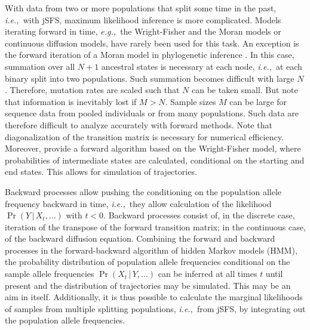 \documentclass[preprint]{elsarticle}
\newcommand\given{{\,|\,}}
\newcommand\eg{{\it e.g.,}}
\newcommand\ie{{\it i.e.,}}
\begin{document}
With data from two or more populations that split some time in the past, \ie\ with jSFS, maximum likelihood inference is more complicated. Models iterating forward in time, \eg\ the Wright-Fisher and the Moran models or continuous diffusion models, have rarely been used for this task. An exception is the forward iteration of a Moran model in phylogenetic inference \citep{Schrempf2016}. In this case, summation over all $N+1$ ancestral states is necessary at each node, \ie\ at each binary split into two populations. Such summation becomes difficult with large $N$. Therefore, mutation rates are scaled such that $N$ can be taken small.  But note that information is inevitably lost if $M>N$. Sample sizes $M$ can be large for sequence data from pooled individuals or from many populations. Such data are therefore difficult to analyze accurately with forward methods. Note that diagonalization of the transition matrix is necessary for numerical efficiency. %
Moreover, \citet{Zhao14} provide a forward algorithm based on the Wright-Fisher model, where probabilities of intermediate states are calculated, conditional on the starting and end states. This allows for simulation of trajectories. 

Backward processes allow pushing the conditioning on the population allele frequency backward in time, \ie\ they allow calculation of the likelihood $\Pr(Y\given X_t, \dots)$ with $t<0$. Backward processes consist of, in the discrete case, iteration of the transpose of the forward transition matrix; in the continuous case, of the backward diffusion equation. Combining the forward and backward processes in the forward-backward algorithm of hidden Markov models (HMM), the probability distribution of population allele frequencies conditional on the sample allele frequencies $\Pr(X_t\given Y,\dots)$ can be inferred at all times $t$ until present and the distribution of trajectories may be simulated. This may be an aim in itself. Additionally, it is thus possible to calculate the marginal likelihoods of samples from multiple splitting populations, \ie\ from jSFS, by integrating out the population allele frequencies.
\end{document}
